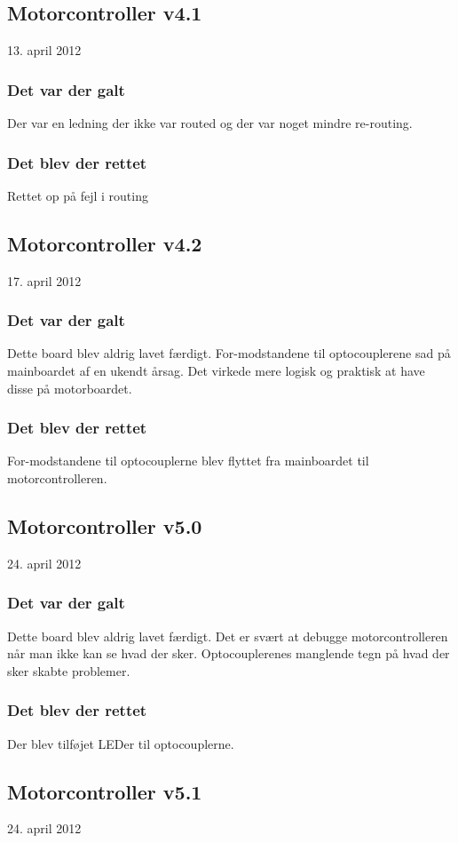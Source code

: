 \documentclass[a4paper,oneside,article,danish,table]{memoir}
\newcommand{\boarddate}[1]{\textcolor{blue!80!black}{#1}}
\begin{document}
\subsection{Motorcontroller v4.1}
\boarddate{13. april 2012}
\subsubsection{Det var der galt} 
Der var en ledning der ikke var routed og der var noget mindre re-routing.
\subsubsection{Det blev der rettet}
Rettet op på fejl i routing
\subsection{Motorcontroller v4.2}
\boarddate{17. april 2012} 
\subsubsection{Det var der galt} 
Dette board blev aldrig lavet færdigt.
For-modstandene til optocouplerene sad på mainboardet af en ukendt årsag. Det virkede mere logisk og praktisk at have disse på motorboardet.
\subsubsection{Det blev der rettet}
For-modstandene til optocouplerne blev flyttet fra mainboardet til motorcontrolleren.
\subsection{Motorcontroller v5.0}
\boarddate{24. april 2012} 
\subsubsection{Det var der galt} 
Dette board blev aldrig lavet færdigt.
Det er svært at debugge motorcontrolleren når man ikke kan se hvad der sker. Optocouplerenes manglende tegn på hvad der sker skabte problemer.
\subsubsection{Det blev der rettet}
Der blev tilføjet LEDer til optocouplerne.
\subsection{Motorcontroller v5.1}
\boarddate{24. april 2012} 
\end{document}

